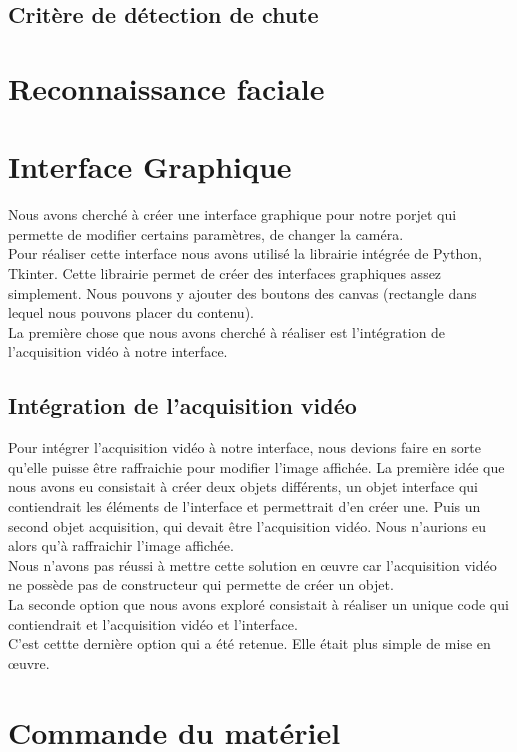 \documentclass[a4paper]{report}
\begin{document}
        \subsection{Critère de détection de chute}
    \section{Reconnaissance faciale}
        \section{Interface Graphique}
            Nous avons cherché à créer une interface graphique pour notre porjet qui permette de modifier certains paramètres, de changer la caméra.\\
            Pour réaliser cette interface nous avons utilisé la librairie intégrée de Python, Tkinter. Cette librairie permet de créer des interfaces graphiques assez simplement. Nous pouvons y ajouter des boutons des canvas (rectangle dans lequel nous pouvons placer du contenu).\\
            La première chose que nous avons cherché à réaliser est l'intégration de l'acquisition vidéo à notre interface. 
            \subsection{Intégration de l'acquisition vidéo}
            Pour intégrer l'acquisition vidéo à notre interface, nous devions faire en sorte qu'elle puisse être raffraichie pour modifier l'image affichée. La première idée que nous avons eu consistait à créer deux objets différents, un objet interface qui contiendrait les éléments de l'interface et permettrait d'en créer une. Puis un second objet acquisition, qui devait être l'acquisition vidéo. Nous n'aurions eu alors qu'à raffraichir l'image affichée.\\
            Nous n'avons pas réussi à mettre cette solution en œuvre car l'acquisition vidéo ne possède pas de constructeur qui permette de créer un objet.\\
            La seconde option que nous avons exploré consistait à réaliser un unique code qui contiendrait et l'acquisition vidéo et l'interface.\\
            C'est cettte dernière option qui a été retenue. Elle était plus simple de mise en œuvre. 
        \section{Commande du matériel}
\end{document}
